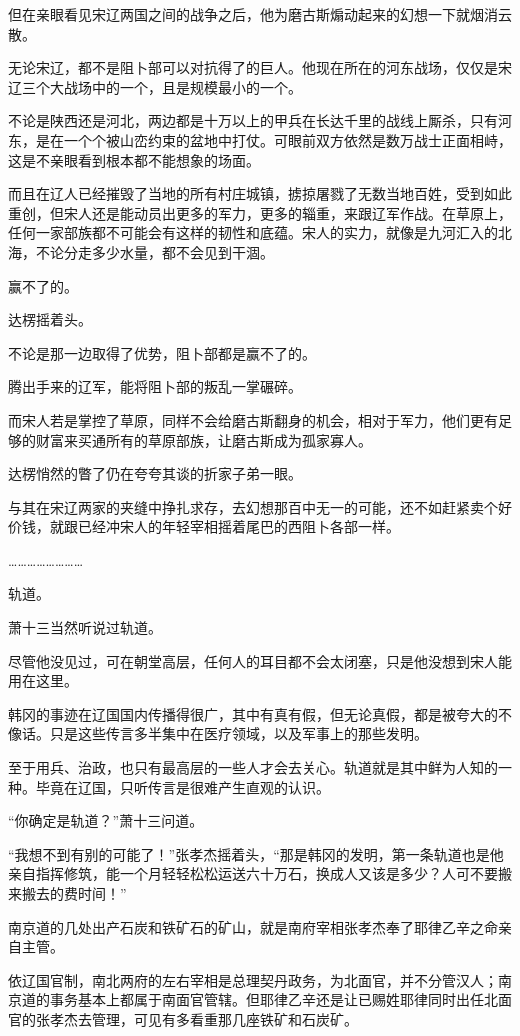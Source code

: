 但在亲眼看见宋辽两国之间的战争之后，他为磨古斯煽动起来的幻想一下就烟消云散。

无论宋辽，都不是阻卜部可以对抗得了的巨人。他现在所在的河东战场，仅仅是宋辽三个大战场中的一个，且是规模最小的一个。

不论是陕西还是河北，两边都是十万以上的甲兵在长达千里的战线上厮杀，只有河东，是在一个个被山峦约束的盆地中打仗。可眼前双方依然是数万战士正面相峙，这是不亲眼看到根本都不能想象的场面。

而且在辽人已经摧毁了当地的所有村庄城镇，掳掠屠戮了无数当地百姓，受到如此重创，但宋人还是能动员出更多的军力，更多的辎重，来跟辽军作战。在草原上，任何一家部族都不可能会有这样的韧性和底蕴。宋人的实力，就像是九河汇入的北海，不论分走多少水量，都不会见到干涸。

赢不了的。

达楞摇着头。

不论是那一边取得了优势，阻卜部都是赢不了的。

腾出手来的辽军，能将阻卜部的叛乱一掌碾碎。

而宋人若是掌控了草原，同样不会给磨古斯翻身的机会，相对于军力，他们更有足够的财富来买通所有的草原部族，让磨古斯成为孤家寡人。

达楞悄然的瞥了仍在夸夸其谈的折家子弟一眼。

与其在宋辽两家的夹缝中挣扎求存，去幻想那百中无一的可能，还不如赶紧卖个好价钱，就跟已经冲宋人的年轻宰相摇着尾巴的西阻卜各部一样。

……………………

轨道。

萧十三当然听说过轨道。

尽管他没见过，可在朝堂高层，任何人的耳目都不会太闭塞，只是他没想到宋人能用在这里。

韩冈的事迹在辽国国内传播得很广，其中有真有假，但无论真假，都是被夸大的不像话。只是这些传言多半集中在医疗领域，以及军事上的那些发明。

至于用兵、治政，也只有最高层的一些人才会去关心。轨道就是其中鲜为人知的一种。毕竟在辽国，只听传言是很难产生直观的认识。

“你确定是轨道？”萧十三问道。

“我想不到有别的可能了！”张孝杰摇着头，“那是韩冈的发明，第一条轨道也是他亲自指挥修筑，能一个月轻轻松松运送六十万石，换成人又该是多少？人可不要搬来搬去的费时间！”

南京道的几处出产石炭和铁矿石的矿山，就是南府宰相张孝杰奉了耶律乙辛之命亲自主管。

依辽国官制，南北两府的左右宰相是总理契丹政务，为北面官，并不分管汉人；南京道的事务基本上都属于南面官管辖。但耶律乙辛还是让已赐姓耶律同时出任北面官的张孝杰去管理，可见有多看重那几座铁矿和石炭矿。

